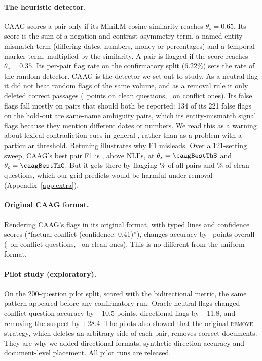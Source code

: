 \paragraph{The heuristic detector.}
CAAG scores a pair only if its MiniLM \citep{reimers2019sbert} cosine similarity reaches $\theta_s=0.65$. Its score
is the sum of a negation and contrast asymmetry term, a named-entity mismatch term (differing dates, numbers, money or
percentages) and a temporal-marker term, multiplied by the similarity. A pair is flagged if the score reaches
$\theta_c=0.35$. Its per-pair flag rate on the confirmatory split ($6.22\%$) sets the rate of the random detector.
CAAG is the detector we set out to study. As a neutral flag it did not beat random flags of the same volume, and
as a removal rule it only deleted correct passages (\dCaagRemClean\ points on clean questions, \dCaagRemConf\ on
conflict ones). Its false flags fall mostly on pairs that should both be reported: 134 of its 221 false flags on the
hold-out are same-name ambiguity pairs, which its entity-mismatch signal flags because they mention different dates or
numbers. We read this as a warning about lexical contradiction cues in general \citep{gururangan2018annotation},
rather than as a problem with a particular threshold. Retuning illustrates why F1 misleads. Over a 121-setting sweep, CAAG's
best pair F1 is \caagBestFOne, above NLI's, at $\theta_s=\caagBestThS$ and $\theta_c=\caagBestThC$. But it gets
there by flagging \caagBestRate\% of all pairs and \caagBestCleanFpr\% of clean questions, which our grid predicts
would be harmful under removal (Appendix~\ref{app:extra}).

\paragraph{Original CAAG format.}
Rendering CAAG's flags in its original format, with typed lines and confidence scores (``factual conflict (confidence:
0.41)''), changes accuracy by \origCaagAll\ points overall (\origCaagConf\ on conflict questions, \origCaagClean\ on
clean ones). This is no different from the uniform format.

\paragraph{Pilot study (exploratory).}
On the 200-question pilot split, scored with the bidirectional metric, the same pattern appeared before any
confirmatory run. Oracle neutral flags changed conflict-question accuracy by $-$10.5 points, directional flags by
$+$11.8, and removing the suspect by $+$28.4. The pilots also showed that the original \textsc{remove} strategy,
which deletes an arbitrary side of each pair, removes correct documents. They are why we added directional formats,
synthetic direction accuracy and document-level placement. All pilot runs are released.

